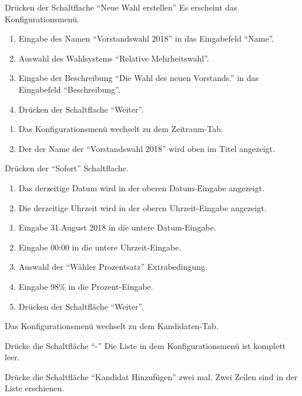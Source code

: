 \documentclass[parskip=full]{scrartcl}
\begin{document}
\teststep{}
		{Drücken der Schaltflache \enquote{Neue Wahl erstellen}}
		{Es erscheint das Konfigurationsmenü.}

\teststep{}
		{\begin{enumerate}
				\item Eingabe des Namen \enquote{Vorstandswahl 2018} in das Eingabefeld \enquote{Name}.
				\item Auswahl des Wahlsystems \enquote{Relative Mehrheitswahl}.
				\item Eingabe der Beschreibung \enquote{Die Wahl des neuen Vorstands.} in das Eingabefeld \enquote{Beschreibung}.
				\item Drücken der Schaltflache \enquote{Weiter}.
		\end{enumerate}}
		{\begin{enumerate}
				\item Das Konfigurationsmenü wechselt zu dem Zeitraum-Tab.
				\item Der der Name der \enquote{Vorstandswahl 2018} wird oben im Titel angezeigt.
		\end{enumerate}}

\teststep{}
		{Drücken der \enquote{Sofort} Schaltflache.}
		{\begin{enumerate}
				\item Das derzeitige Datum wird in der oberen Datum-Eingabe angezeigt.
				\item Die derzeitige Uhrzeit wird in der oberen Uhrzeit-Eingabe angezeigt.
		\end{enumerate}}
	
\teststep{}
		{\begin{enumerate}
				\item Eingabe 31.August 2018 in die untere Datum-Eingabe.
				\item Eingabe 00:00 in die untere Uhrzeit-Eingabe.
				\item Auswahl der \enquote{Wähler Prozentsatz} Extrabedingung.
				\item Eingabe 98\% in die Prozent-Eingabe.
				\item Drücken der Schaltfläche \enquote{Weiter}.
		\end{enumerate}}
		{Das Konfigurationsmenü wechselt zu dem Kandidaten-Tab.}

\teststep{}
		{Drücke die Schaltfläche \enquote{-}}
		{Die Liste in dem Konfigurationsmenü ist komplett leer.}
		
\teststep{}
		{Drücke die Schaltfläche \enquote{Kandidat Hinzufügen} zwei mal.}
		{Zwei Zeilen sind in der Liste erschienen.}
	
\end{document}
